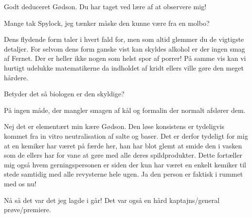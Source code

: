 \documentclass[a4paper,11pt]{article}
\begin{document}
\begin{sketch}
 Godt deduceret Gødson. Du har taget ved lære af at observere mig!

 Mange tak Spylock, jeg tænker måske den kunne være fra en molbo?

 Dens flydende form taler i hvert fald for, men som altid glemmer du de vigtigste detaljer. For selvom dens form ganske vist kan skyldes alkohol er der ingen smag af Fernet. Der er heller ikke nogen som helst spor af porrer! På samme vis kan vi hurtigt udelukke matematikerne da indholdet af kridt ellers ville gøre den meget hårdere.

 Betyder det så biologen er den skyldige?

 På ingen måde, der mangler smagen af kål og formalin der normalt afslører dem. 

 Nej det er elementært min kære Gødson. Den løse konsistens er tydeligvis kommet fra in vitro neutralisation af salte og baser. Det er derfor tydeligt for mig at en kemiker har været på færde her, han har blot glemt at smide den i vasken som de ellers har for vane at gøre med alle deres spildprodukter. Dette fortæller mig også hvem gerningspersonen er siden der kun har været en enkelt kemiker til stede samtidig med alle revysterne hele ugen. Ja den person er faktisk i rummet med os nu!


 Nå så det var det jeg lagde i går! Det var også en hård kaptajns/general prøve/premiere.




\end{sketch}
\end{document}
